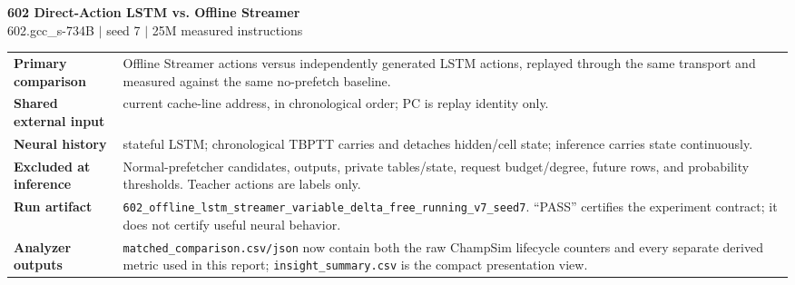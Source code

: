 \documentclass[10pt]{article}
\begin{document}
\begin{center}
{\LARGE\bfseries\color{navy} 602 Direct-Action LSTM vs. Offline Streamer}\\[2pt]
{\small 602.gcc\_s-734B \quad $\vert$ \quad seed 7 \quad $\vert$ \quad 25M measured instructions}\\[4pt]
\quad
{}
\end{center}

\begin{infobox}
\begin{tabularx}{\textwidth}{@{}>{\bfseries}lX@{}}
Primary comparison & Offline Streamer actions versus independently generated LSTM actions, replayed through the same transport and measured against the same no-prefetch baseline.\\
Shared external input & current cache-line address, in chronological order; PC is replay identity only.\\
Neural history & stateful LSTM; chronological TBPTT carries and detaches hidden/cell state; inference carries state continuously.\\
Excluded at inference & Normal-prefetcher candidates, outputs, private tables/state, request budget/degree, future rows, and probability thresholds.  Teacher actions are labels only.\\
Run artifact & \texttt{602\_offline\_lstm\_streamer\_variable\_delta\_free\_running\_v7\_seed7}.  ``PASS'' certifies the experiment contract; it does not certify useful neural behavior.\\
Analyzer outputs & \texttt{matched\_comparison.csv/json} now contain both the
raw ChampSim lifecycle counters and every separate derived metric used in this
report; \texttt{insight\_summary.csv} is the compact presentation view.\\
\end{tabularx}
\end{infobox}
\end{document}
